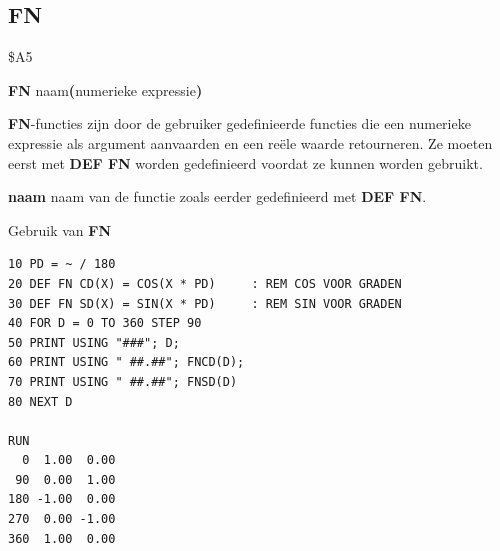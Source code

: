
\newpage
\subsection{FN}
\begin{description}[leftmargin=2cm,style=nextline]
\item [Token:]    \$A5

\item [Formaat:]   {\bf FN} naam{\bf(}numerieke expressie{\bf)}

\item [Gebruik:]    {\bf FN}-functies zijn door de gebruiker gedefinieerde functies die een numerieke expressie als argument aanvaarden en een reële waarde retourneren.                  Ze moeten eerst met {\bf DEF FN} worden gedefinieerd voordat ze kunnen worden gebruikt.

                  {\bf naam} naam van de functie zoals eerder gedefinieerd met {\bf DEF FN}.

\item [Voorbeeld:]  Gebruik van {\bf FN}

\begin{tcolorbox}[colback=black,coltext=white]
\verbatimfont{\codefont}
\begin{verbatim}
10 PD = ~ / 180
20 DEF FN CD(X) = COS(X * PD)     : REM COS VOOR GRADEN
30 DEF FN SD(X) = SIN(X * PD)     : REM SIN VOOR GRADEN
40 FOR D = 0 TO 360 STEP 90
50 PRINT USING "###"; D;
60 PRINT USING " ##.##"; FNCD(D);
70 PRINT USING " ##.##"; FNSD(D)
80 NEXT D

RUN
  0  1.00  0.00
 90  0.00  1.00
180 -1.00  0.00
270  0.00 -1.00
360  1.00  0.00
\end{verbatim}
\end{tcolorbox}
\end{description}


\newpage
